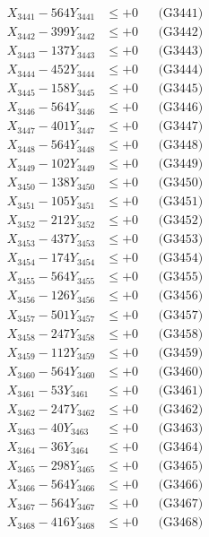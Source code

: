 \documentclass[a4paper,10pt]{article}
\begin{document}
{\begin{align}
\allowbreak
X_{3441} - 564Y_{3441} &\leq +0 && \text{(G3441)} \\
X_{3442} - 399Y_{3442} &\leq +0 && \text{(G3442)} \\
X_{3443} - 137Y_{3443} &\leq +0 && \text{(G3443)} \\
X_{3444} - 452Y_{3444} &\leq +0 && \text{(G3444)} \\
X_{3445} - 158Y_{3445} &\leq +0 && \text{(G3445)} \\
X_{3446} - 564Y_{3446} &\leq +0 && \text{(G3446)} \\
X_{3447} - 401Y_{3447} &\leq +0 && \text{(G3447)} \\
X_{3448} - 564Y_{3448} &\leq +0 && \text{(G3448)} \\
X_{3449} - 102Y_{3449} &\leq +0 && \text{(G3449)} \\
X_{3450} - 138Y_{3450} &\leq +0 && \text{(G3450)} \\
\allowbreak
X_{3451} - 105Y_{3451} &\leq +0 && \text{(G3451)} \\
X_{3452} - 212Y_{3452} &\leq +0 && \text{(G3452)} \\
X_{3453} - 437Y_{3453} &\leq +0 && \text{(G3453)} \\
X_{3454} - 174Y_{3454} &\leq +0 && \text{(G3454)} \\
X_{3455} - 564Y_{3455} &\leq +0 && \text{(G3455)} \\
X_{3456} - 126Y_{3456} &\leq +0 && \text{(G3456)} \\
X_{3457} - 501Y_{3457} &\leq +0 && \text{(G3457)} \\
X_{3458} - 247Y_{3458} &\leq +0 && \text{(G3458)} \\
X_{3459} - 112Y_{3459} &\leq +0 && \text{(G3459)} \\
X_{3460} - 564Y_{3460} &\leq +0 && \text{(G3460)} \\
\allowbreak
X_{3461} - 53Y_{3461} &\leq +0 && \text{(G3461)} \\
X_{3462} - 247Y_{3462} &\leq +0 && \text{(G3462)} \\
X_{3463} - 40Y_{3463} &\leq +0 && \text{(G3463)} \\
X_{3464} - 36Y_{3464} &\leq +0 && \text{(G3464)} \\
X_{3465} - 298Y_{3465} &\leq +0 && \text{(G3465)} \\
X_{3466} - 564Y_{3466} &\leq +0 && \text{(G3466)} \\
X_{3467} - 564Y_{3467} &\leq +0 && \text{(G3467)} \\
X_{3468} - 416Y_{3468} &\leq +0 && \text{(G3468)} \\

\end{align}}
\end{document}
